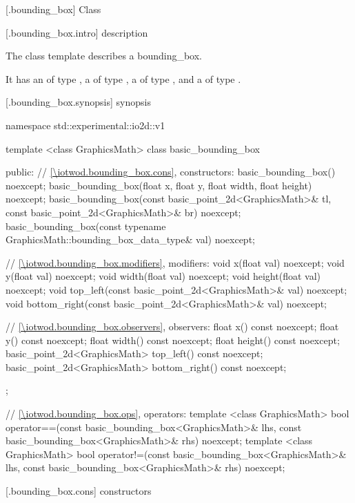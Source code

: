  [\iotwod.bounding_box] {Class }

 [\iotwod.bounding_box.intro] { description}

%
\pnum
The class template  describes a bounding_box.

\pnum
It has an  of type , a  of type , a  of type , and a  of type .

 [\iotwod.bounding_box.synopsis] { synopsis}

\begin{codeblock}
namespace std::experimental::io2d::v1 {
  template <class GraphicsMath>
  class basic_bounding_box {
  public:
    // \ref{\iotwod.bounding_box.cons}, constructors:
    basic_bounding_box() noexcept;
    basic_bounding_box(float x, float y, float width, float height) noexcept;
    basic_bounding_box(const basic_point_2d<GraphicsMath>& tl,
      const basic_point_2d<GraphicsMath>& br) noexcept;
    basic_bounding_box(const typename GraphicsMath::bounding_box_data_type& val) noexcept;

    // \ref{\iotwod.bounding_box.modifiers}, modifiers:
    void x(float val) noexcept;
    void y(float val) noexcept;
    void width(float val) noexcept;
    void height(float val) noexcept;
    void top_left(const basic_point_2d<GraphicsMath>& val) noexcept;
    void bottom_right(const basic_point_2d<GraphicsMath>& val) noexcept;

    // \ref{\iotwod.bounding_box.observers}, observers:
    float x() const noexcept;
    float y() const noexcept;
    float width() const noexcept;
    float height() const noexcept;
    basic_point_2d<GraphicsMath> top_left() const noexcept;
    basic_point_2d<GraphicsMath> bottom_right() const noexcept;
  };

  // \ref{\iotwod.bounding_box.ops}, operators:
  template <class GraphicsMath>
  bool operator==(const basic_bounding_box<GraphicsMath>& lhs,
    const basic_bounding_box<GraphicsMath>& rhs) noexcept;
  template <class GraphicsMath>
  bool operator!=(const basic_bounding_box<GraphicsMath>& lhs,
    const basic_bounding_box<GraphicsMath>& rhs) noexcept;
}
\end{codeblock}

 [\iotwod.bounding_box.cons] { constructors}

